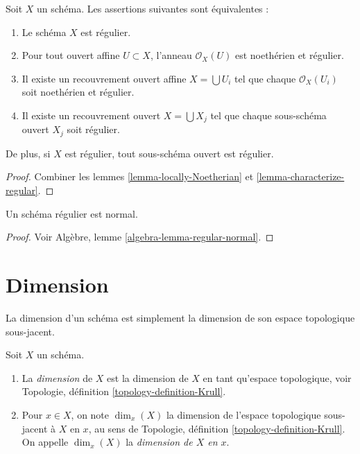 \begin{lemma}
\label{lemma-locally-regular}
Soit $X$ un schéma. Les assertions suivantes sont équivalentes :
\begin{enumerate}
\item Le schéma $X$ est régulier.
\item Pour tout ouvert affine $U \subset X$, l'anneau $\mathcal{O}_X(U)$
est noethérien et régulier.
\item Il existe un recouvrement ouvert affine $X = \bigcup U_i$ tel que
chaque $\mathcal{O}_X(U_i)$ soit noethérien et régulier.
\item Il existe un recouvrement ouvert $X = \bigcup X_j$
tel que chaque sous-schéma ouvert $X_j$ soit régulier.
\end{enumerate}
De plus, si $X$ est régulier, tout sous-schéma ouvert est régulier.
\end{lemma}

\begin{proof}
Combiner les lemmes \ref{lemma-locally-Noetherian}
et \ref{lemma-characterize-regular}.
\end{proof}

\begin{lemma}
\label{lemma-regular-normal}
Un schéma régulier est normal.
\end{lemma}

\begin{proof}
Voir
Algèbre, lemme \ref{algebra-lemma-regular-normal}.
\end{proof}

\section{Dimension}
\label{section-dimension}

\noindent
La dimension d'un schéma est simplement la dimension de son espace
topologique sous-jacent.

\begin{definition}
\label{definition-dimension}
Soit $X$ un schéma.
\begin{enumerate}
\item La {\it dimension} de $X$ est la dimension de $X$
en tant qu'espace topologique, voir
Topologie, définition \ref{topology-definition-Krull}.
\item Pour $x \in X$, on note $\dim_x(X)$ la dimension de l'espace topologique
sous-jacent à $X$ en $x$, au sens de
Topologie, définition \ref{topology-definition-Krull}.
On appelle $\dim_x(X)$ la {\it dimension de $X$ en $x$}.
\end{enumerate}
\end{definition}

